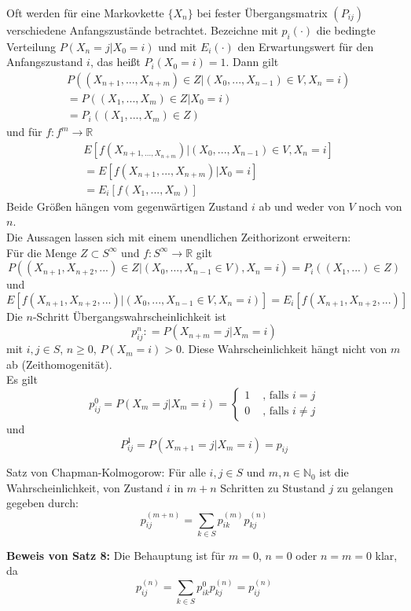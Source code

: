 \documentclass[a4paper,12pt]{article}
\begin{document}
Oft werden für eine Markovkette $\{X_n\}$ bei fester Übergangsmatrix $(P_{ij})$ verschiedene Anfangszustände betrachtet.
Bezeichne mit $p_i(\cdot)$ die bedingte Verteilung $P(X_n = j | X_0 = i)$ und mit $E_i(\cdot)$ den Erwartungswert für  den Anfangszustand $i$, das heißt $P_i(X_0 = i) = 1$.
Dann gilt
\begin{align*}
	 & P((X_{n+1}, ..., X_{n+m})\in Z | (X_0, ..., X_{n-1})\in V, X_n = i) \\
	 & = P((X_1, ..., X_m)\in Z | X_0 = i)                                 \\
	 & = P_i((X_1, ..., X_m) \in Z)
\end{align*}
und für $f: f^m \to \mathbb{R}$
\begin{align*}
	 & E[f(X_{n+1, ..., X_{n+m}})| (X_0, ..., X_{n-1})\in V, X_n = i] \\
	 & =   E[f(X_{n+1}, ..., X_{n+m})| X_0 = i]                       \\
	 & =   E_i[f(X_1, ..., X_m)]
\end{align*}
Beide Größen hängen vom gegenwärtigen Zustand $i$ ab und weder von $V$ noch von $n$.\\
Die Aussagen lassen sich mit einem unendlichen Zeithorizont erweitern:\\
Für die Menge $Z \subset S^\infty$ und $f: S^\infty \to \mathbb{R}$ gilt
$$
	P((X_{n+1}, X_{n+2}, ...) \in Z | (X_0, ..., X_{n-1}\in V), X_n = i) = P_i((X_1, ...)\in Z)
$$
und
$$
	E[f(X_{n+1}, X_{n+2}, ...)|(X_0, ..., X_{n-1} \in V, X_n = i)] = E_i[f(X_{n+1}, X_{n+2}, ...)]
$$
Die $n$-Schritt Übergangswahrscheinlichkeit ist
$$
	p_{ij}^n : = P(X_{n+m} = j|X_m = i)
$$
mit $i,j \in S$, $n \geq 0$, $P(X_m = i) > 0$. Diese Wahrscheinlichkeit hängt nicht von $m$ ab (Zeithomogenität).\\
Es gilt
$$
	p_{ij}^0 = P(X_m = j | X_m = i) = \begin{cases}
		1 & \text{ , falls } i = j    \\
		0 & \text{ , falls } i \neq j
	\end{cases}
$$
und
$$
	P_{ij}^1 = P(X_{m+1} = j | X_m = i) = p_{ij}
$$
\begin{tcolorbox}[breakable, colframe=green, colback=white, title=Satz 8]
	Satz von Chapman-Kolmogorow: Für alle $i,j \in S$ und $m,n \in \mathbb{N}_0$ ist die Wahrscheinlichkeit, von Zustand $i$ in $m+n$ Schritten zu Stustand $j$ zu gelangen gegeben durch:
	$$
		p_{ij}^{(m+n)} = \sum_{k \in S} p_{ik}^{(m)}p_{kj}^{(n)}
	$$
\end{tcolorbox}
\textbf{Beweis von Satz 8:}
Die Behauptung ist für $m=0$, $n=0$ oder $n=m=0$ klar, da
$$
	p_{ij}^{(n)} = \sum_{k \in S} p_{ik}^{0}p_{kj}^{(n)} = p_{ij}^{(n)}
$$
\end{document}
